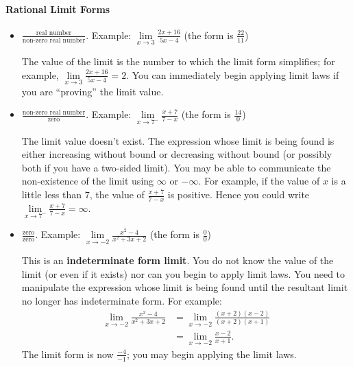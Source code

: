 \documentclass[12pt,]{book}
\newcommand{\terminology}[1]{\textbf{#1}}
\theoremstyle{plain}
\theoremstyle{definition}
\theoremstyle{definition}
\theoremstyle{definition}
\theoremstyle{definition}
\theoremstyle{definition}
\numberwithin{equation}{section}
\begin{document}
\paragraph[{Rational Limit Forms}]{Rational Limit Forms}\hypertarget{paragraphs-23}{}
\leavevmode%
\begin{itemize}[label=\textbullet]
\item{}\(\frac{\text{real number}}{\text{non-zero real number}}\). Example: \(\lim\limits_{x\to3}\frac{2x+16}{5x-4}\) (the form is \(\frac{22}{11}\))%
\par
The value of the limit is the number to which the limit form simplifies; for example, \(\lim\limits_{x\to3}\frac{2x+16}{5x-4}=2\). You can immediately begin applying limit laws if you are ``proving'' the limit value. %
\end{itemize}
\leavevmode%
\begin{itemize}[label=\textbullet]
\item{}\(\frac{\text{non-zero real number}}{\text{zero}}\). Example: \(\lim\limits_{x\to7^{-}}\frac{x+7}{7-x}\) (the form is \(\frac{14}{0}\))%
\par
The limit value doesn't exist. The expression whose limit is being found is either increasing without bound or decreasing without bound (or possibly both if you have a two-sided limit).   You may be able to communicate the non-existence of the limit using \(\infty\) or \(-\infty\). For example, if the value of \(x\) is a little less than \(7\), the value of \(\frac{x+7}{7-x}\) is positive.  Hence you could write \(\lim\limits_{x\to7^{-}}\frac{x+7}{7-x}=\infty\).%
\end{itemize}
\leavevmode%
\begin{itemize}[label=\textbullet]
\item{}\(\frac{\text{zero}}{\text{zero}}\). Example: \(\lim\limits_{x\to-2}\frac{x^2-4}{x^2+3x+2}\) (the form is \(\frac{0}{0}\))%
\par
This is an \terminology{indeterminate form limit}. You do not know the value of the limit (or even if it exists) nor can you begin to apply limit laws.  You need to manipulate the expression whose limit is being found until the resultant limit no longer has indeterminate form.  For example:\begin{align*}
\lim_{x\to-2}\frac{x^2-4}{x^2+3x+2}&=\lim_{x\to-2}\frac{(x+2)(x-2)}{(x+2)(x+1)}\\
&=\lim_{x\to-2}\frac{x-2}{x+1}\text{.}
\end{align*}The limit form is now \(\frac{-4}{-1}\); you may begin applying the limit laws.%
\end{itemize}
\end{document}
